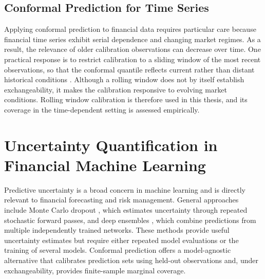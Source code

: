 \subsection{Conformal Prediction for Time Series}
\label{subsec:cp_timeseries}

Applying conformal prediction to financial data requires particular care because financial time series exhibit serial dependence and changing market regimes. As a result, the relevance of older calibration observations can decrease over time. One practical response is to restrict calibration to a sliding window of the most recent observations, so that the conformal quantile reflects current rather than distant historical conditions \cite{barber2023conformal, angelopoulos2023gentle}. Although a rolling window does not by itself establish exchangeability, it makes the calibration responsive to evolving market conditions. Rolling window calibration is therefore used in this thesis, and its coverage in the time-dependent setting is assessed empirically.

\section{Uncertainty Quantification in Financial Machine Learning}
\label{sec:uq_finance}

Predictive uncertainty is a broad concern in machine learning and is directly relevant to financial forecasting and risk management. General approaches include Monte Carlo dropout \cite{gal2016dropout}, which estimates uncertainty through repeated stochastic forward passes, and deep ensembles \cite{lakshminarayanan2017simple}, which combine predictions from multiple independently trained networks. These methods provide useful uncertainty estimates but require either repeated model evaluations or the training of several models. Conformal prediction offers a model-agnostic alternative that calibrates prediction sets using held-out observations and, under exchangeability, provides finite-sample marginal coverage.

